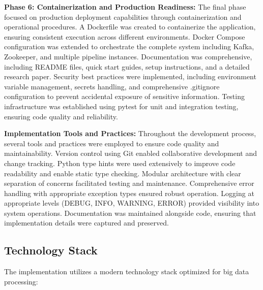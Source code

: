 \documentclass[12pt,a4paper]{article}
\begin{document}
\textbf{Phase 6: Containerization and Production Readiness:} The final phase focused on production deployment capabilities through containerization and operational procedures. A Dockerfile was created to containerize the application, ensuring consistent execution across different environments. Docker Compose configuration was extended to orchestrate the complete system including Kafka, Zookeeper, and multiple pipeline instances. Documentation was comprehensive, including README files, quick start guides, setup instructions, and a detailed research paper. Security best practices were implemented, including environment variable management, secrets handling, and comprehensive .gitignore configuration to prevent accidental exposure of sensitive information. Testing infrastructure was established using pytest for unit and integration testing, ensuring code quality and reliability.

\textbf{Implementation Tools and Practices:} Throughout the development process, several tools and practices were employed to ensure code quality and maintainability. Version control using Git enabled collaborative development and change tracking. Python type hints were used extensively to improve code readability and enable static type checking. Modular architecture with clear separation of concerns facilitated testing and maintenance. Comprehensive error handling with appropriate exception types ensured robust operation. Logging at appropriate levels (DEBUG, INFO, WARNING, ERROR) provided visibility into system operations. Documentation was maintained alongside code, ensuring that implementation details were captured and preserved.

\subsection{Technology Stack}

The implementation utilizes a modern technology stack optimized for big data processing:
\end{document}
